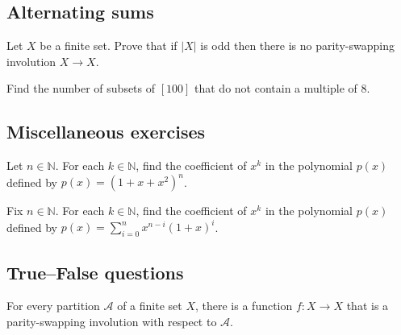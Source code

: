 \subsection*{Alternating sums}

\begin{chapex}
\label{exNoParitySwappingInvolutionFromOddSizedSetToItself}
Let $X$ be a finite set. Prove that if $|X|$ is odd then there is no parity-swapping involution $X \to X$.
\end{chapex}

\begin{chapex}
Find the number of subsets of $[100]$ that do not contain a multiple of $8$.
\end{chapex}

\subsection*{Miscellaneous exercises}

\begin{chapex}
Let $n \in \mathbb{N}$. For each $k \in \mathbb{N}$, find the coefficient of $x^k$ in the polynomial $p(x)$ defined by $p(x) = (1+x+x^2)^n$.
\end{chapex}

\begin{chapex}
Fix $n \in \mathbb{N}$. For each $k \in \mathbb{N}$, find the coefficient of $x^k$ in the polynomial $p(x)$ defined by $p(x) = \sum_{i=0}^n x^{n-i}(1+x)^i$.
\end{chapex}

\subsection*{True--False questions}


\begin{chapex} %
\label{cqCombinatoricsTFBegin}
\label{cqCombinatoricsTFEnd}
For every partition $\mathcal{A}$ of a finite set $X$, there is a function $f : X \to X$ that is a parity-swapping involution with respect to $\mathcal{A}$.
\end{chapex}

